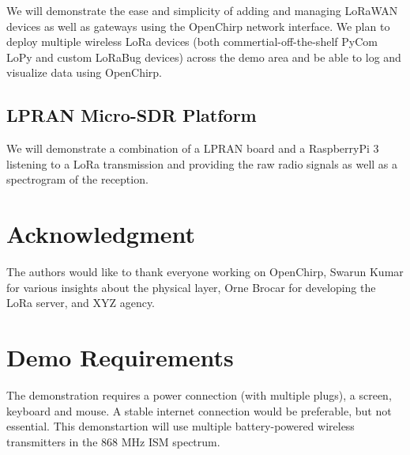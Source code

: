 \documentclass[conference]{IEEEtran}
\begin{document}
We will demonstrate the ease and simplicity of adding and managing LoRaWAN
devices as well as gateways using the OpenChirp network interface. We plan to
deploy multiple wireless LoRa devices (both commertial-off-the-shelf PyCom
LoPy and custom LoRaBug devices) across the demo area and be able to log and
visualize data using OpenChirp.


\subsection{LPRAN Micro-SDR Platform}
\label{sec:lpran-demo}

We will demonstrate a combination of a LPRAN board and a RaspberryPi 3
listening to a LoRa transmission and providing the raw radio signals as well
as a spectrogram of the reception.

\section*{Acknowledgment}

The authors would like to thank everyone working on OpenChirp, Swarun Kumar
for various insights about the physical layer, Orne Brocar for developing the
LoRa server, and {\color{red} XYZ} agency.




\section{Demo Requirements}
\label{sec:requirements}

The demonstration requires a power connection (with multiple plugs), a screen,
keyboard and mouse. A stable internet connection would be preferable, but not
essential. This demonstartion will use multiple battery-powered wireless
transmitters in the 868 MHz ISM spectrum.
\end{document}
